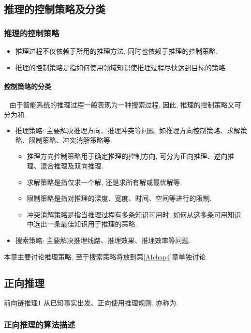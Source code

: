 \subsection{推理的控制策略及分类}
\subsubsection{推理的控制策略}
\begin{itemize}
\item 推理过程不仅依赖于所用的推理方法, 同时也依赖于推理的控制策略.
\item 推理的控制策略是指如何使用领域知识使推理过程尽快达到目标的策略.
\end{itemize}
\paragraph{控制策略的分类}~{}
由于智能系统的推理过程一般表现为一种搜索过程, 因此, 推理的控制策略又可分为和.
\begin{itemize}
\item 推理策略: 主要解决推理方向、推理冲突等问题, 如推理方向控制策略、求解策略、限制策略、冲突消解策略等.
    \begin{itemize}
    \item 推理方向控制策略用于确定推理的控制方向, 可分为正向推理、逆向推理、混合推理及双向推理.
    \item 求解策略是指仅求一个解, 还是求所有解或最优解等.
    \item 限制策略是指对推理的深度、宽度、时间、空间等进行的限制.
    \item 冲突消解策略是指当推理过程有多条知识可用时, 如何从这多条可用知识中选出一条最佳知识用于推理的策略.
    \end{itemize}
\item 搜索策略: 主要解决推理线路、推理效果、推理效率等问题.
\end{itemize}
本章主要讨论推理策略, 至于搜索策略将放到第\ref{AIchap4}章单独讨论.
\subsection{正向推理}
\begin{mydef}{前向链推理}{1}
从已知事实出发、正向使用推理规则, 亦称为.
\end{mydef}
\subsubsection{正向推理的算法描述}

